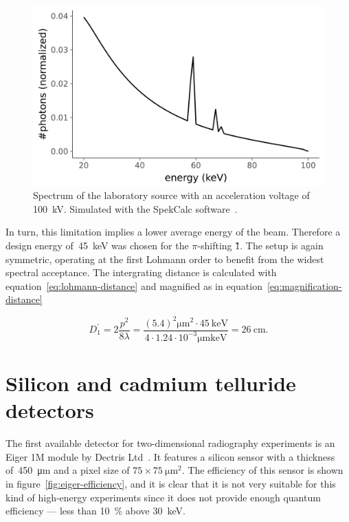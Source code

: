 \begin{figure}[htb]
    \centering
    \includegraphics[width=\textwidth]{gfx/spectrum-visibility/spectrum-100kV.png}
    \caption{Spectrum of the laboratory source with an acceleration voltage of
        \SI{100}{\kilo\volt}. Simulated with the SpekCalc
        software~\parencite{spekcalc}.}
    \label{fig:spectrum-100kV}
\end{figure}

In turn, this limitation implies a lower average energy of the beam.
Therefore a design energy of~\SI{45}{\kilo\eV} was chosen for the
$\pi$-shifting \G1. The setup is again symmetric, operating at the first
Lohmann order to benefit from the widest spectral acceptance. The
intergrating distance is calculated with
equation~\eqref{eq:lohmann-distance} and magnified as in
equation~\eqref{eq:magnification-distance}

\begin{equation}
    D_1^\prime = 2\frac{p^2}{8\lambda} =
    \frac{(5.4)^2\si{\micro\meter\squared} \cdot \SI{45}{\kilo\eV}}{4
        \cdot 1.24 \cdot 10^{-3}\si{\micro\meter\kilo\eV}} =
        \SI{26}{\centi\meter}.
    \label{eq:intergrating-distance}
\end{equation}

\section{Silicon and cadmium telluride detectors}

The first available detector for two-dimensional radiography experiments is
an Eiger 1M module by Dectris Ltd~\parencite{dectris-eiger, 1748-0221-9-05-C05032}. It features a silicon sensor
with a thickness of~\SI{450}{\micro\meter} and a pixel size of
$75\times\SI{75}{\micro\meter\squared}$. The efficiency of this sensor is
shown in figure~\ref{fig:eiger-efficiency}, and it is clear that it is not
very suitable for this kind of high-energy experiments since it does not
provide enough quantum efficiency --- less than \SI{10}{\percent} above
\SI{30}{\kilo\eV}.

